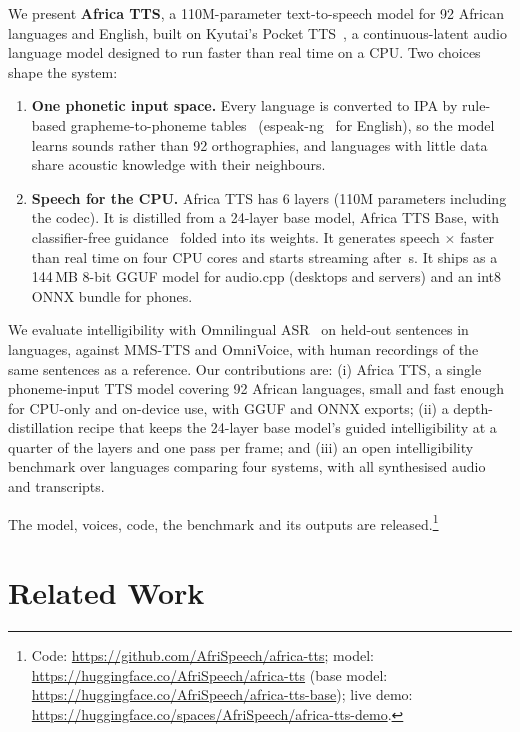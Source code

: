 \documentclass[10pt,twocolumn]{article}
\newcommand{\att}{Africa TTS}
\newcommand{\attbase}{Africa TTS Base}
\begin{document}
We present \textbf{\att{}}, a 110M-parameter text-to-speech model for 92 African languages and English,
built on Kyutai's Pocket TTS~\cite{pockettts,rouard2025calm}, a continuous-latent audio language
model designed to run faster than real time on a CPU. Two choices shape the system:
\begin{enumerate}
  \item \textbf{One phonetic input space.} Every language is converted to IPA by rule-based
  grapheme-to-phoneme tables~\cite{africag2p} (espeak-ng~\cite{espeakng} for English), so the
  model learns sounds rather than 92 orthographies, and languages with little data share
  acoustic knowledge with their neighbours.
  \item \textbf{Speech for the CPU.} \att{} has 6 layers (110M parameters including the
  codec). It is distilled from a 24-layer base model, \attbase{}, with classifier-free
  guidance~\cite{ho2022cfg} folded into its weights. It generates speech
  \xrtturbopython{}$\times$ faster than real time on four CPU cores and starts streaming after
  \ttfaturbopython{}\,s. It ships as a 144\,MB 8-bit GGUF model for audio.cpp (desktops and
  servers) and an int8 ONNX bundle for phones.
\end{enumerate}

We evaluate intelligibility with Omnilingual ASR~\cite{omniasr2025} on held-out sentences in
\nTrainedLangs{} languages, against MMS-TTS and OmniVoice, with human recordings of the same sentences as a reference.
Our contributions are: (i) \att{}, a single phoneme-input TTS model covering 92 African
languages, small and fast enough for CPU-only and on-device use, with GGUF and ONNX exports; (ii) a
depth-distillation recipe that keeps the 24-layer base model's guided intelligibility at a
quarter of the layers and one pass per frame; and (iii) an open intelligibility benchmark over \nTrainedLangs{} languages comparing four systems, with all
synthesised audio and transcripts.

The model, voices, code, the benchmark and its outputs are released.\footnote{Code:
\url{https://github.com/AfriSpeech/africa-tts}; model:
\url{https://huggingface.co/AfriSpeech/africa-tts} (base model:
\url{https://huggingface.co/AfriSpeech/africa-tts-base}); live demo:
\url{https://huggingface.co/spaces/AfriSpeech/africa-tts-demo}.}

\section{Related Work}
\end{document}
